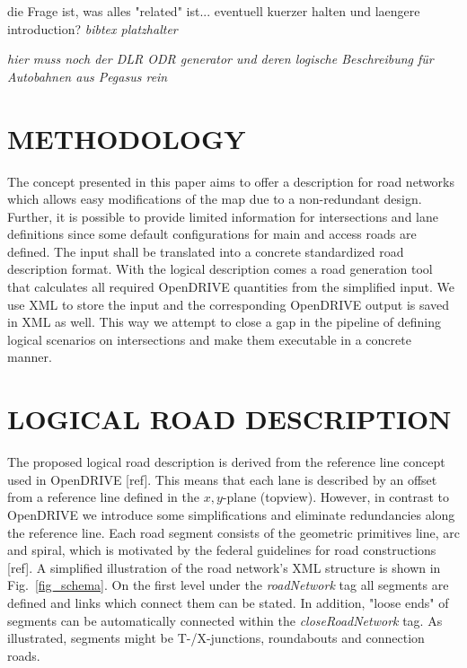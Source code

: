\documentclass[a4paper, 10pt, conference]{ieeeconf}      %
\begin{document}
die Frage ist, was alles "related" ist... eventuell kuerzer halten und laengere introduction? \textit{bibtex platzhalter} \cite{BagschikG..2018} \cite{Roesener2017}

\textit{hier muss noch der DLR ODR generator und deren logische Beschreibung für Autobahnen aus Pegasus rein \cite{dlrODRgen}}

\section{METHODOLOGY}
The concept presented in this paper aims to offer a description for road networks which allows easy modifications of the map due to a non-redundant design. Further, it is possible to provide limited information for intersections and lane definitions since some default configurations for main and access roads are defined. The input shall be translated into a concrete standardized road description format. With the logical description comes a road generation tool that calculates all required OpenDRIVE quantities from the simplified input. We use XML to store the input and the corresponding OpenDRIVE output is saved in XML as well. This way we attempt to close a gap in the pipeline of defining logical scenarios on intersections and make them executable in a concrete manner.

\section{LOGICAL ROAD DESCRIPTION}
The proposed logical road description is derived from the reference line concept used in OpenDRIVE [ref]. This means that each lane is described by an offset from a reference line defined in the $x,y$-plane (topview). However, in contrast to OpenDRIVE we introduce some simplifications and eliminate redundancies along the reference line. Each road segment consists of the geometric primitives line, arc and spiral, which is motivated by the federal guidelines for road constructions [ref]. A simplified illustration of the road network's XML structure is shown in Fig.~\ref{fig_schema}. On the first level under the \textit{roadNetwork} tag all segments are defined and links which connect them can be stated. In addition, "loose ends" of segments can be automatically connected within the \textit{closeRoadNetwork} tag. As illustrated, segments might be T-/X-junctions, roundabouts and connection roads. 
\end{document}
